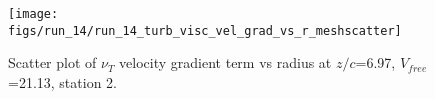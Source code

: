 \begin{figure}[H]
\centering
\texttt{[image: figs/run\_14/run\_14\_turb\_visc\_vel\_grad\_vs\_r\_meshscatter]}
\caption{Scatter plot of $\nu_T$ velocity gradient term vs radius at $z/c$=6.97, $V_{free}$=21.13, station 2.}
\label{fig:run_14_turb_visc_vel_grad_vs_r_meshscatter}
\end{figure}


